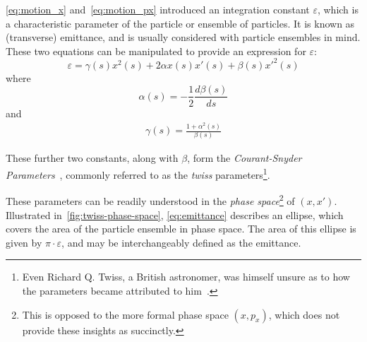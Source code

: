 \documentclass[11pt]{report}
\begin{document}
\autoref{eq:motion_x} and~\autoref{eq:motion_px} introduced an integration constant $\varepsilon$, which is a characteristic parameter of the particle or ensemble of particles. It is known as (transverse) emittance, and is usually considered with particle ensembles in mind. These two equations can be manipulated to provide an expression for $\varepsilon$:
\begin{equation}
  \varepsilon = \gamma(s)x^2(s)+2\alpha x(s)x'(s)+\beta(s)x'^2(s)
  \label{eq:emittance}
\end{equation} where 
\begin{equation}
  \alpha(s) = -\frac12\frac{d\beta(s)}{ds}
  \label{eq:alpha}
\end{equation} and
\begin{eqnarray}
  \gamma(s) = \frac{1+\alpha^2(s)}{\beta(s)}
  \label{eq:gamma}
\end{eqnarray}

These further two constants, along with $\beta$, form the \textit{Courant-Snyder Parameters}~\cite{courantsnyder}, commonly referred to as the \textit{twiss} parameters\footnote{Even Richard Q. Twiss, a British astronomer, was himself unsure as to how the parameters became attributed to him~\cite{richardtwiss}.}. 

These parameters can be readily understood in the \textit{phase space}\footnote{This is opposed to the more formal phase space $(x, p_x)$, which does not provide these insights as succinctly.} of $(x, x')$. Illustrated in~\autoref{fig:twiss-phase-space}, \autoref{eq:emittance} describes an ellipse, which covers the area of the particle ensemble in phase space. The area of this ellipse is given by $\pi\cdot\varepsilon$, and may be interchangeably defined as the emittance. 
\end{document}
